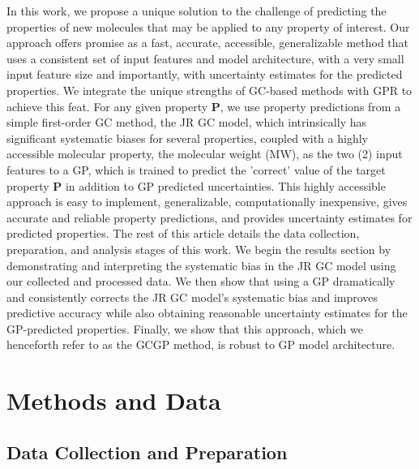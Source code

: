 \documentclass[journal=jacsat,manuscript=article]{achemso}
\newcommand{\alltodo}[1]{{\color{Cyan} (\texttt{alltodo}: #1)}}
\begin{document}
In this work, we propose a unique solution to the challenge of predicting the properties of new molecules that may be applied to any property of interest. Our approach offers promise as a fast, accurate, accessible, generalizable method that uses a consistent set of input features and model architecture, with a very small input feature size and importantly, with uncertainty estimates for the predicted properties.
We integrate the unique strengths of GC-based methods with GPR to achieve this feat. For any given property \textbf{P}, we use property predictions from a simple first-order GC method, the JR GC model, which intrinsically has significant systematic biases for several properties, coupled with a highly accessible molecular property, the molecular weight (MW), as the two (2) input features to a GP, which is trained to predict the 'correct' value of the target property \textbf{P} in addition to GP predicted uncertainties.
This highly accessible approach is easy to implement, generalizable, computationally inexpensive, gives accurate and reliable property predictions, and provides uncertainty estimates for predicted properties.
The rest of this article details the data collection, preparation, and analysis stages of this work. We begin the results section by demonstrating and interpreting the systematic bias in the JR GC model using our collected and processed data. We then show that using a GP dramatically and consistently corrects the JR GC model's systematic bias and improves predictive accuracy while also obtaining reasonable uncertainty estimates for the GP-predicted properties. Finally, we show that this approach, which we henceforth refer to as the GCGP method, is robust to GP model architecture.

\section{Methods and Data}

\subsection{Data Collection and Preparation}
\end{document}
